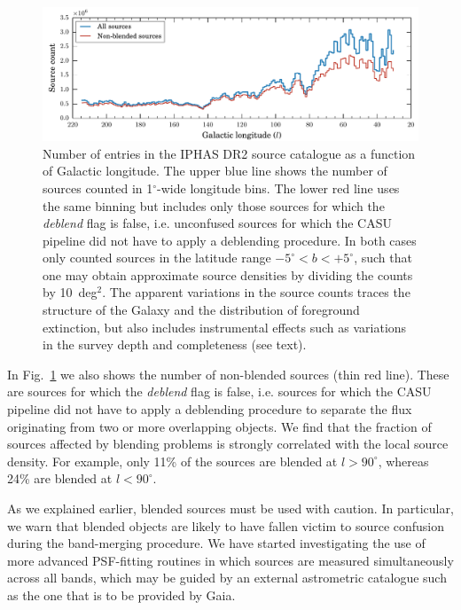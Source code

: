 \documentclass[useAMS,usenatbib]{mn2e}
\def\deg{$^{\circ}$}
\begin{document}
\begin{figure}
    \includegraphics[width=\textwidth]{figures/sourcecount/sourcecount.pdf} 
    \caption{Number of entries in the IPHAS DR2 source catalogue
    as a function of Galactic longitude.
    The upper blue line shows the number of sources
    counted in 1\deg-wide longitude bins.
    The lower red line uses the same binning
    but includes only those sources 
    for which the \emph{deblend} flag is {\sc false}, 
    i.e. unconfused sources for which the CASU pipeline
    did not have to apply a deblending procedure.
    In both cases only counted sources
    in the latitude range $-5^\circ<b<+5^\circ$,
    such that one may obtain approximate source densities
    by dividing the counts by 10~deg$^2$.
    The apparent variations in the source counts
    traces the structure of the Galaxy
    and the distribution of foreground extinction,
    but also includes instrumental effects
	such as variations in the survey depth
	and completeness (see text).
   }
    \label{fig:sourcecount}
\end{figure}

In Fig.~\ref{fig:sourcecount} we also shows the number
of non-blended sources (thin red line).
These are sources for which the \emph{deblend} flag is {\sc false},
i.e. sources for which the CASU pipeline did not have to apply 
a deblending procedure to separate the flux
originating from two or more overlapping objects.
We find that the fraction of sources affected by blending problems
is strongly correlated with the local source density.
For example, only 11\% of the sources are blended
at $l>90^\circ$, whereas 24\% are blended at $l<90^\circ$.

As we explained earlier, blended sources must be used with caution.
In particular, we warn that blended objects
are likely to have fallen victim
to source confusion during the band-merging procedure.
We have started investigating the use of
more advanced PSF-fitting routines
in which sources are measured simultaneously across all bands,
which may be guided by an external astrometric catalogue
such as the one that is to be provided by Gaia.
\end{document}
